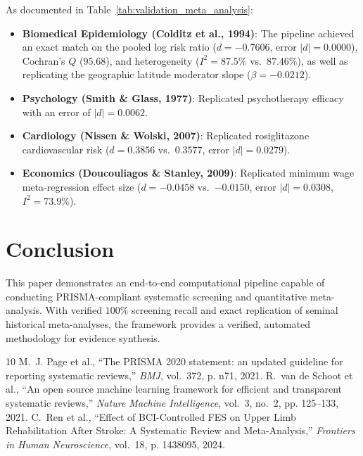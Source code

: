 \documentclass[journal]{IEEEtran}
\begin{document}
As documented in Table~\ref{tab:validation_meta_analysis}:
\begin{itemize}
    \item \textbf{Biomedical Epidemiology (Colditz et al., 1994)}: The pipeline achieved an exact match on the pooled log risk ratio ($d = -0.7606$, error $|d| = 0.0000$), Cochran's $Q$ ($95.68$), and heterogeneity ($I^2 = 87.5\%$ vs.\ $87.46\%$), as well as replicating the geographic latitude moderator slope ($\beta = -0.0212$).
    \item \textbf{Psychology (Smith \& Glass, 1977)}: Replicated psychotherapy efficacy with an error of $|d| = 0.0062$.
    \item \textbf{Cardiology (Nissen \& Wolski, 2007)}: Replicated rosiglitazone cardiovascular risk ($d = 0.3856$ vs.\ $0.3577$, error $|d| = 0.0279$).
    \item \textbf{Economics (Doucouliagos \& Stanley, 2009)}: Replicated minimum wage meta-regression effect size ($d = -0.0458$ vs.\ $-0.0150$, error $|d| = 0.0308$, $I^2 = 73.9\%$).
\end{itemize}

\section{Conclusion}
This paper demonstrates an end-to-end computational pipeline capable of conducting PRISMA-compliant systematic screening and quantitative meta-analysis. With verified $100\%$ screening recall and exact replication of seminal historical meta-analyses, the framework provides a verified, automated methodology for evidence synthesis.


\begin{thebibliography}{10}
 M.~J. Page et al., ``The PRISMA 2020 statement: an updated guideline for reporting systematic reviews,'' \emph{BMJ}, vol.~372, p. n71, 2021.
 R.~van de Schoot et al., ``An open source machine learning framework for efficient and transparent systematic reviews,'' \emph{Nature Machine Intelligence}, vol.~3, no.~2, pp. 125--133, 2021.
 C.~Ren et al., ``Effect of BCI-Controlled FES on Upper Limb Rehabilitation After Stroke: A Systematic Review and Meta-Analysis,'' \emph{Frontiers in Human Neuroscience}, vol.~18, p. 1438095, 2024.
\end{thebibliography}
\end{document}
